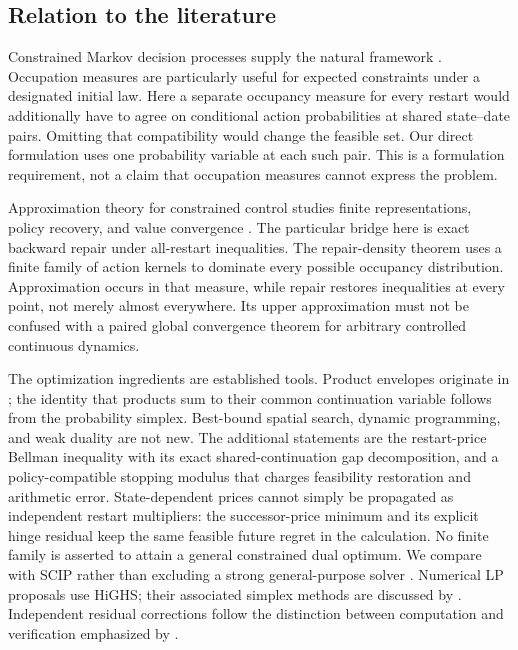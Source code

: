 \subsection{Relation to the literature}
Constrained Markov decision processes supply the natural framework \citep{Altman1999}. Occupation measures are particularly useful for expected constraints under a designated initial law. Here a separate occupancy measure for every restart would additionally have to agree on conditional action probabilities at shared state--date pairs. Omitting that compatibility would change the feasible set. Our direct formulation uses one probability variable at each such pair. This is a formulation requirement, not a claim that occupation measures cannot express the problem.

Approximation theory for constrained control studies finite representations, policy recovery, and value convergence \citep{DufourPrietoRumeau2013,Saldi2018,SaldiLinderYuksel2018}. The particular bridge here is exact backward repair under all-restart inequalities. The repair-density theorem uses a finite family of action kernels to dominate every possible occupancy distribution. Approximation occurs in that measure, while repair restores inequalities at every point, not merely almost everywhere. Its upper approximation must not be confused with a paired global convergence theorem for arbitrary controlled continuous dynamics.

The optimization ingredients are established tools. Product envelopes originate in \citet{McCormick1976}; the identity that products sum to their common continuation variable follows from the probability simplex. Best-bound spatial search, dynamic programming, and weak duality are not new. The additional statements are the restart-price Bellman inequality with its exact shared-continuation gap decomposition, and a policy-compatible stopping modulus that charges feasibility restoration and arithmetic error. State-dependent prices cannot simply be propagated as independent restart multipliers: the successor-price minimum and its explicit hinge residual keep the same feasible future regret in the calculation. No finite family is asserted to attain a general constrained dual optimum. We compare with SCIP rather than excluding a strong general-purpose solver \citep{HojnyEtAl2025}. Numerical LP proposals use HiGHS; their associated simplex methods are discussed by \citet{HuangfuHall2018}. Independent residual corrections follow the distinction between computation and verification emphasized by \citet{Rump2010}.

